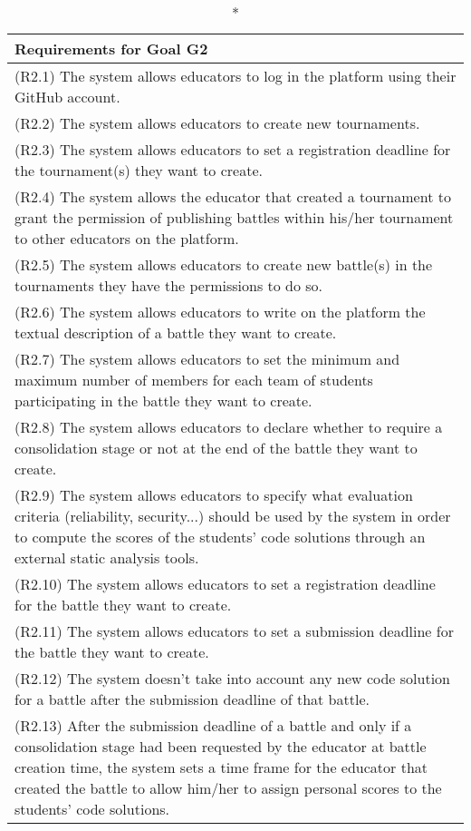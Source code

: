\begin{longtable}{|p{16.5cm}|}
	\caption*{Requirements for Goal G2}\\
	\hline

(R2.1) The system allows educators to log in the platform using their GitHub account. \\
\hline
(R2.2) The system allows educators to create new tournaments.  \\
\hline
(R2.3) The system allows educators to set a registration deadline for the tournament(s) they want to create.  \\
\hline
(R2.4) The system allows the educator that created a tournament to grant the permission of publishing battles within his/her tournament to other educators on the platform. \\
\hline
(R2.5) The system allows educators to create new battle(s) in the tournaments they have the permissions to do so. \\
\hline
(R2.6) The system allows educators to write on the platform the textual description of a battle they want to create.  \\
\hline
(R2.7) The system allows educators to set the minimum and maximum number of members for each team of students participating in the battle they want to create.  \\
\hline
(R2.8) The system allows educators to declare whether to require a consolidation stage or not at the end of the battle they want to create.  \\
\hline
(R2.9) The system allows educators to specify what evaluation criteria (reliability, security...) should be used by the system in order to compute the scores of the students' code solutions through an external static analysis tools.  \\
\hline
(R2.10) The system allows educators to set a registration deadline for the battle they want to create.  \\
\hline
(R2.11) The system allows educators to set a submission deadline for the battle they want to create.  \\
\hline
(R2.12) The system doesn't take into account any new code solution for a battle after the submission deadline of that battle.  \\
\hline
(R2.13) After the submission deadline of a battle and only if a consolidation stage had been requested by the educator at battle creation time, the system sets a time frame for the educator that created the battle to allow him/her to assign personal scores to the students’ code solutions.  \\

\end{longtable}

